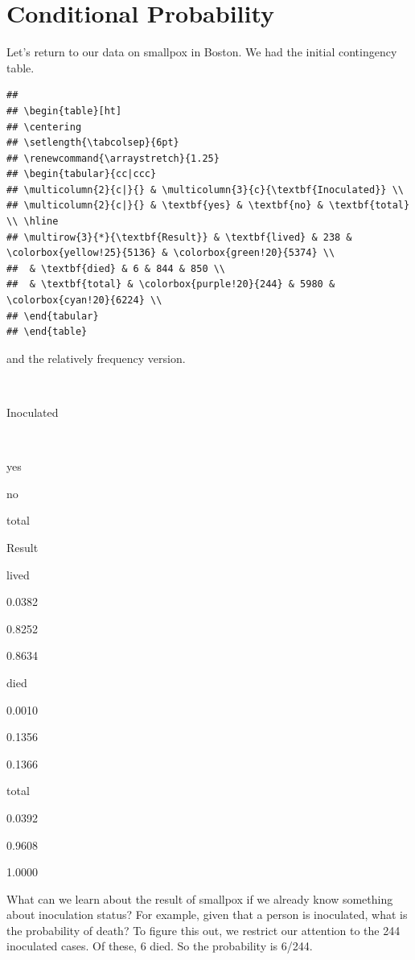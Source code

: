 \documentclass[
]{book}
\begin{document}
\section{Conditional Probability}\label{conditional-probability}

Let's return to our data on smallpox in Boston. We had the initial contingency table.

\begin{verbatim}
## 
## \begin{table}[ht]
## \centering
## \setlength{\tabcolsep}{6pt}
## \renewcommand{\arraystretch}{1.25}
## \begin{tabular}{cc|ccc}
## \multicolumn{2}{c|}{} & \multicolumn{3}{c}{\textbf{Inoculated}} \\
## \multicolumn{2}{c|}{} & \textbf{yes} & \textbf{no} & \textbf{total} \\ \hline
## \multirow{3}{*}{\textbf{Result}} & \textbf{lived} & 238 & \colorbox{yellow!25}{5136} & \colorbox{green!20}{5374} \\
##  & \textbf{died} & 6 & 844 & 850 \\
##  & \textbf{total} & \colorbox{purple!20}{244} & 5980 & \colorbox{cyan!20}{6224} \\
## \end{tabular}
## \end{table}
\end{verbatim}

and the relatively frequency version.

~

Inoculated

~

yes

no

total

Result

lived

0.0382

{0.8252}

{0.8634}

died

0.0010

0.1356

0.1366

total

{0.0392}

0.9608

{1.0000}

What can we learn about the result of smallpox if we already know something about inoculation status? For example, given that a person is inoculated, what is the probability of death? To figure this out, we restrict our attention to the 244 inoculated cases. Of these, 6 died. So the probability is 6/244.
\end{document}
